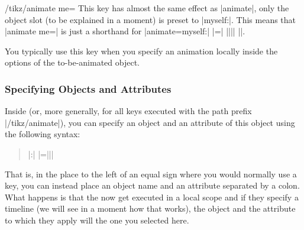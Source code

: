 \begin{key}{/tikz/animate me=}
  This key has almost the same effect as |animate|, only the object
  slot (to be explained in a moment) is preset to |myself:|. This
  means that |animate me=| is just a shorthand for
  |animate={myself:| |=| |{||}| |}|.

  You typically use this key when you specify an animation locally
  inside the options of the to-be-animated object.
\end{key}



\subsubsection{Specifying Objects and Attributes}

Inside  (or, more generally, for all
keys executed with the path prefix |/tikz/animate|), you can specify
an object and an attribute of this object using the following syntax:
\begin{quote}
  \normalfont
  |:| |={||}|
\end{quote}
That is, in the place to the left of an equal sign where you would
normally use a key, you can instead place an object name and an
attribute separated by a colon. What happens is that the
 now get executed in a local scope and if they specify a
timeline (we will see in a moment how that works), the object and the
attribute to which they apply will the one you selected here.







\endinput


Creating an animation is done using the following command:

